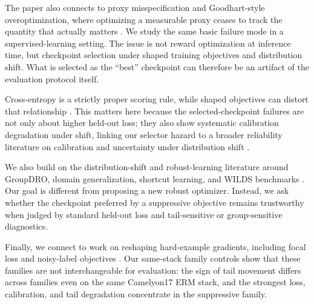The paper also connects to proxy misspecification and Goodhart-style overoptimization, where optimizing a measurable proxy ceases to track the quantity that actually matters \citep{manheim2018categorizinggoodhart,gao2023scalinglawsreward,kwa2024catastrophicgoodhart,laidlaw2025correlatedproxies}.
We study the same basic failure mode in a supervised-learning setting.
The issue is not reward optimization at inference time, but checkpoint selection under shaped training objectives and distribution shift.
What is selected as the ``best'' checkpoint can therefore be an artifact of the evaluation protocol itself.

Cross-entropy is a strictly proper scoring rule, while shaped objectives can distort that relationship \citep{savage1971elicitation,gneiting2007strictlyproper,reid2010composite}.
This matters here because the selected-checkpoint failures are not only about higher held-out loss; they also show systematic calibration degradation under shift, linking our selector hazard to a broader reliability literature on calibration and uncertainty under distribution shift \citep{guo2017calibration,ovadia2019uncertaintyshift,komisarenko2024improvingcalibration,brier1950verification,degroot1983comparingforecasters}.

We also build on the distribution-shift and robust-learning literature around GroupDRO, domain generalization, shortcut learning, and WILDS benchmarks \citep{sagawa2020groupdro,koh2021wilds,arjovsky2019irm,gulrajani2020domainbed,geirhos2020shortcutlearning,kirichenko2023lastlayer,bejnordi2017camelyon}.
Our goal is different from proposing a new robust optimizer.
Instead, we ask whether the checkpoint preferred by a suppressive objective remains trustworthy when judged by standard held-out loss and tail-sensitive or group-sensitive diagnostics.

Finally, we connect to work on reshaping hard-example gradients, including focal loss and noisy-label objectives \citep{lin2017focalloss,natarajan2013noisylabels,patrini2017losscorrection,reed2014bootstrapping,zhang2018generalizedcrossentropy}.
Our same-stack family controls show that these families are not interchangeable for evaluation: the sign of tail movement differs across families even on the same Camelyon17 ERM stack, and the strongest loss, calibration, and tail degradation concentrate in the suppressive family.
